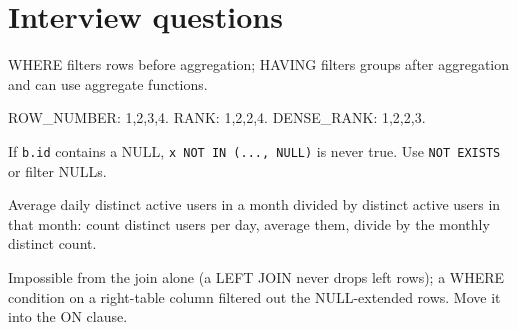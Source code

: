 \section{Interview questions}
\A WHERE filters rows before aggregation; HAVING filters groups after aggregation and can use aggregate functions.

\A ROW\_NUMBER: 1,2,3,4. RANK: 1,2,2,4. DENSE\_RANK: 1,2,2,3.

\A If \texttt{b.id} contains a NULL, \texttt{x NOT IN (..., NULL)} is never true. Use \texttt{NOT EXISTS} or filter NULLs.

\A Average daily distinct active users in a month divided by distinct active users in that month: count distinct users per day, average them, divide by the monthly distinct count.

\A Impossible from the join alone (a LEFT JOIN never drops left rows); a WHERE condition on a right-table column filtered out the NULL-extended rows. Move it into the ON clause.
